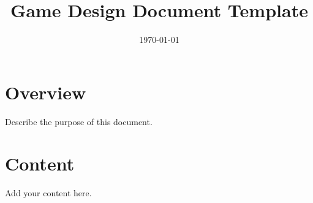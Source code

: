 \documentclass[11pt]{article}
\title{Game Design Document Template}
\author{}
\date{\today}
\begin{document}
\maketitle

\section{Overview}
Describe the purpose of this document.

\section{Content}
Add your content here.
\end{document}
